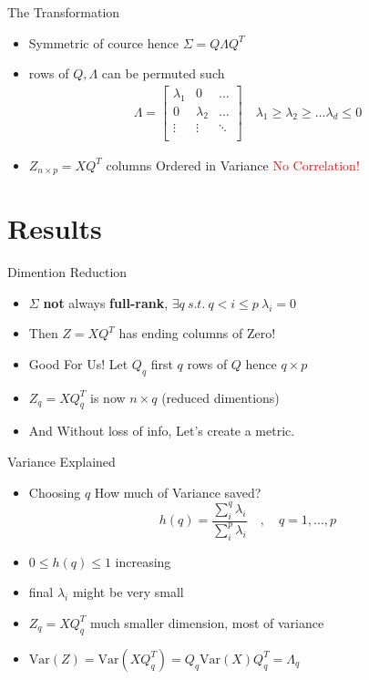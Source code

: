 \documentclass{beamer}
\begin{document}
\begin{frame}{The Transformation} 
\begin{itemize}
    \item Symmetric of cource hence \(\Sigma = Q\Lambda Q^T\)
    \item rows of \(Q, \Lambda\) can be permuted such
    \begin{eqnarray*}
        \Lambda = \begin{bmatrix}
            \lambda_1 & 0 &\dots  \\
            0 & \lambda_2 & \dots \\
            \vdots & \vdots & \ddots \\
        \end{bmatrix} \quad \lambda_1 \ge \lambda_2 \ge\dots \lambda_d \le 0
    \end{eqnarray*}
    \item \(Z_{n\times p} = XQ^T \) columns Ordered in Variance \textcolor{red}{No Correlation!}
\end{itemize}
\end{frame}


\section{Results}
\begin{frame}{Dimention Reduction}
    \begin{itemize}
        \item \(\Sigma\) \textbf{not} always \textbf{full-rank}, \(\exists q \ s.t. \ q <  i \le p \ \lambda_i = 0\)
        \item Then \(Z = XQ^T\) has ending columns of Zero!
        \item Good For Us! Let \(Q_q\) first \(q\) rows of \(Q\) hence \(q\times p\)
        \item \(Z_q = XQ_q^T\) is now \(n\times q\) (reduced dimentions) 
        \item And Without loss of info, Let's create a metric.
    \end{itemize}
\end{frame}

\begin{frame}{Variance Explained}
    \begin{itemize}
        \item Choosing \(q\) How much of Variance saved?
        \[h(q) = \frac{\sum_i^q \lambda_i}{\sum_i^p \lambda_i } \quad , \quad q = 1, \dots , p \] 
        \item \( 0 \le h(q) \le 1 \) increasing
        \item final \(\lambda_i\) might be very small
        \item \(Z_q = XQ^T_q\) much smaller dimension, most of variance
        \item \(\text{Var}(Z) = \text{Var}(XQ^T_q) = Q_q\text{Var}(X)Q^T_q = \Lambda_q\)
    \end{itemize}
\end{frame}
\end{document}
